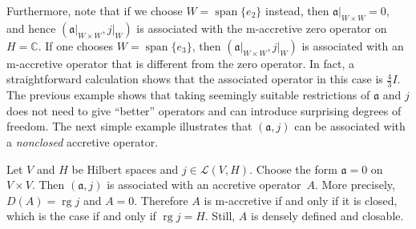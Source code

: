 \documentclass[a4paper,oneside,12pt]{amsart}
\theoremstyle{plain}
\theoremstyle{definition}
\newenvironment{example}
{\pushQED{\qed}

\examplex}
{\popQED\endexamplex}
\begin{document}
\begin{example}
Furthermore, note that if we choose $W=\operatorname{span}\{e_2\}$ instead, then ${\ensuremath{{{{\mathfrak{{a}}}}}|_{{W\times W}}}}=0$, and hence
$({\ensuremath{{{{\mathfrak{{a}}}}}|_{{W\times W}}}},{\ensuremath{{j}|_{{W}}}})$ is associated with the {\ensuremath{\text{m}}}-accretive zero operator on $H={\mathbb{C}}$.
If one chooses $W=\operatorname{span}\{e_3\}$, then $({\ensuremath{{{{\mathfrak{{a}}}}}|_{{W\times W}}}},{\ensuremath{{j}|_{{W}}}})$ is associated with an {\ensuremath{\text{m}}}-accretive operator that is different from the zero operator. In fact, a
straightforward calculation shows that the associated operator in this case is $\tfrac{4}{3}I$. 
\end{example}
The previous example shows that taking seemingly suitable restrictions of ${{\mathfrak{{a}}}}$ and $j$ 
does not need to give ``better'' operators and can introduce surprising degrees of freedom.
The next simple example illustrates that $({{\mathfrak{{a}}}},j)$ can be associated with a \emph{nonclosed} accretive operator.
\begin{example}
Let $V$ and $H$ be Hilbert spaces and $j\in{\mathcal{L}}(V,H)$.
Choose the form ${{\mathfrak{{a}}}}=0$ on $V\times V$. Then $({{\mathfrak{{a}}}},j)$ is associated with an accretive operator~$A$.
More precisely, $D(A)=\operatorname{rg} j$ and $A=0$. Therefore $A$ is {\ensuremath{\text{m}}}-accretive if and only if it is closed,
which is the case if and only if $\operatorname{rg} j=H$.
Still, $A$ is densely defined and closable.
\end{example}
\end{document}

